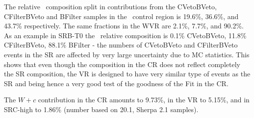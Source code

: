 The relative \Wjets\ composition split in contributions from the CVetoBVeto, CFilterBVeto and BFilter samples in the \Wjets\ control region is 19.6\%, 36.6\%, and 43.7\% respectively. The same fractions in the WVR are 2.1\%, 7.7\%, and 90.2\%. As an example in SRB-T0 the \Wjets\ relative composition is 0.1\% CVetoBVeto, 11.8\% CFilterBVeto, 88.1\% BFilter - the numbers of CVetoBVeto and CFilterBVeto events in the SR are affected by very large uncertainty due to MC statistics. This shows that even though the composition in the CR does not reflect completely the SR composition, the VR is designed to have very similar type of events as the SR and being hence a very good test of the goodness of the Fit in the CR.

The $W+c$ contribution in the CR amounts to 9.73\%, in the VR to 5.15\%, and in SRC-high to 1.86\% (number based on 20.1, Sherpa 2.1 samples).







\clearpage

